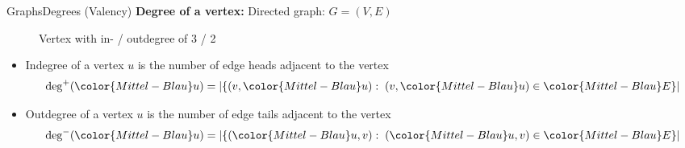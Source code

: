


\begin{frame}{Graphs}{Degrees (Valency)}
  \textbf{Degree of a vertex:} Directed graph:
   {\color{Mittel-Blau}$G = (V , E)$}
    \begin{figure}
    \begin{adjustbox}{width=0.325\linewidth}
      
    \end{adjustbox}
    \caption{Vertex with in- / outdegree of 3 / 2}
    \label{fig:graph:degree_directed}
  \end{figure}      
  \begin{itemize}
    \item<3->
     {\color{Mittel-Blau}Indegree} of a vertex {\color{Mittel-Blau}$u$}
     is the number of {\color{Mittel-Blau}edge heads} adjacent to the
     vertex
     \begin{displaymath}
       \mathrm{deg}^{+}({\color{Mittel-Blau}u}) =
       \left\vert \{
         (v, {\color{Mittel-Blau}u})
         : \; (v, {\color{Mittel-Blau}u}) \in {\color{Mittel-Blau}E} \} 
       \right\vert
      \end{displaymath}
    \item<4->
      {\color{Mittel-Blau}Outdegree} of a vertex {\color{Mittel-Blau}$u$}
      is the number of {\color{Mittel-Blau}edge tails} adjacent to the
      vertex
      \begin{displaymath}
        \mathrm{deg}^{-}({\color{Mittel-Blau}u}) =
        \left\vert \{
          ({\color{Mittel-Blau}u}, v)
          : \; ({\color{Mittel-Blau}u}, v) \in {\color{Mittel-Blau}E} \}
        \right\vert
      \end{displaymath}
  \end{itemize} 
\end{frame}


